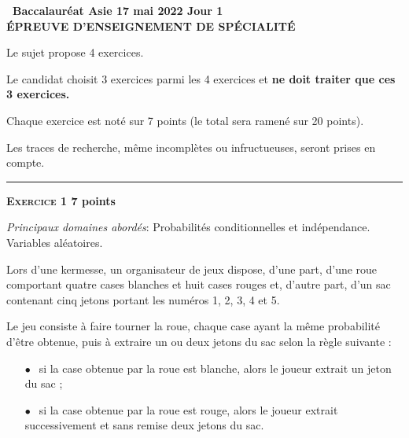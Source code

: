 \documentclass[11pt]{article}
\begin{document}
\setlength\parindent{0mm}
\pagestyle{fancy}
\thispagestyle{empty}

\begin{center}{\Large\textbf{\decofourleft~Baccalauréat Asie 17 mai 2022 Jour 1~\decofourright\\[6pt] ÉPREUVE D'ENSEIGNEMENT DE SPÉCIALITÉ}}


\vspace{0,25cm}

Le sujet propose 4 exercices.

Le candidat choisit 3 exercices parmi les 4 exercices et \textbf{ne doit traiter que ces 3 exercices.}

\medskip

Chaque exercice est noté sur 7 points (le total sera ramené sur 20 points). 

\medskip

Les traces de recherche, même incomplètes ou infructueuses, seront prises en compte.

\hrule
\end{center}

\bigskip

\textbf{\textsc{Exercice 1} \hfill 7 points}

\medskip

\emph{Principaux domaines abordés}: Probabilités conditionnelles et indépendance. Variables aléatoires.

\medskip

Lors d'une kermesse, un organisateur de jeux dispose, d'une part, d'une roue comportant quatre cases blanches et huit cases rouges et, d'autre part, d'un sac contenant cinq jetons portant les numéros 1, 2, 3, 4 et 5.

Le jeu consiste à faire tourner la roue, chaque case ayant la même probabilité d'être obtenue, puis à extraire un ou deux jetons du sac selon la règle suivante :

\setlength\parindent{1cm}
\begin{itemize}
\item[$\bullet~~$] si la case obtenue par la roue est blanche, alors le joueur extrait un jeton du sac ;
\item[$\bullet~~$] si la case obtenue par la roue est rouge, alors le joueur extrait successivement et sans remise deux jetons du sac.
\end{itemize}
\setlength\parindent{0cm}
\end{document}
